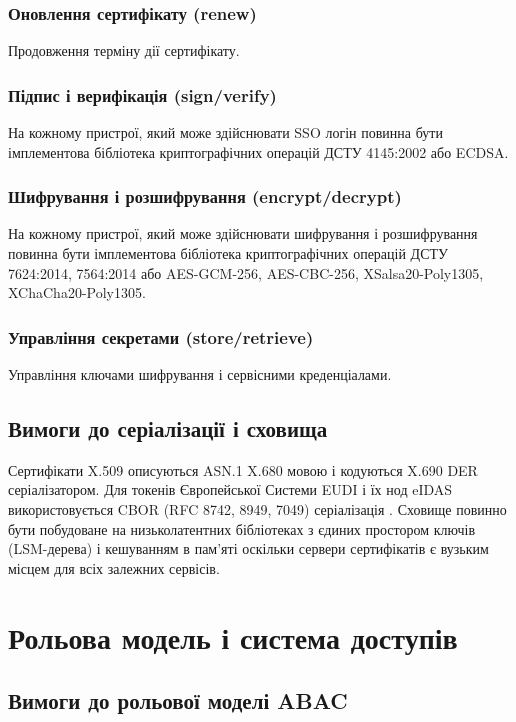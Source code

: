 \documentclass{article}
\begin{document}
\subsubsection{Оновлення сертифікату (renew)}
Продовження терміну дії сертифікату.

\subsubsection{Підпис і верифікація (sign/verify)}
На кожному пристрої, який може здійснювати SSO логін повинна бути імплементова бібліотека криптографічних операцій ДСТУ 4145:2002 або ECDSA.

\subsubsection{Шифрування і розшифрування (encrypt/decrypt)}
На кожному пристрої, який може здійснювати шифрування і розшифрування повинна бути імплементова бібліотека
криптографічних операцій ДСТУ 7624:2014, 7564:2014 або AES-GCM-256, AES-CBC-256, XSalsa20-Poly1305, XChaCha20-Poly1305.

\subsubsection{Управління секретами (store/retrieve)}
Управління ключами шифрування і сервісними креденціалами.

\subsection{Вимоги до серіалізації і сховища}
Сертифікати X.509 описуються ASN.1 X.680 мовою і кодуються X.690 DER серіалізатором. Для токенів Європейської Системи EUDI і
їх нод eIDAS використовується CBOR (RFC 8742, 8949, 7049) серіалізація \cite{cbor}.
Сховище повинно бути побудоване на низьколатентних бібліотеках з єдиних простором ключів (LSM-дерева) і кешуванням в пам'яті
оскільки сервери сертифікатів є вузьким місцем для всіх залежних сервісів.

\newpage
\section{Рольова модель і система доступів}

\subsection{Вимоги до рольової моделі ABAC}
\end{document}
